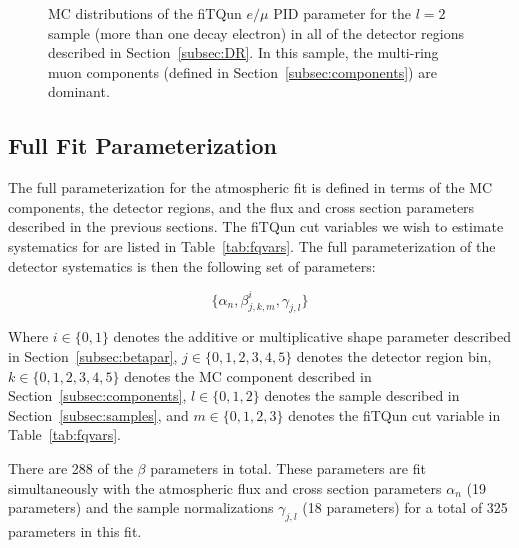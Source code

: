 \begin{figure}[h!]
\begin{tabular}{l  l  l}
\end{tabular} 
\caption{MC distributions of the fiTQun $e/\mu$ PID parameter for the $l=2$ 
sample (more than one decay electron) in all of the detector regions described in
Section~\ref{subsec:DR}.  In this sample, the multi-ring muon components
(defined in Section~\ref{subsec:components}) are dominant.}
\label{fig:samplot2}
\end{figure}
\FloatBarrier




\subsection{Full Fit Parameterization}
\label{subsec:fullpars}

The full parameterization for the atmospheric fit is defined in terms of the MC
components, the detector regions, and the flux and cross section parameters
described in the previous sections.  The fiTQun cut variables we wish to
estimate systematics for are listed in Table~\ref{tab:fqvars}. The full
parameterization of the detector systematics is then the following set of
parameters:

\begin{equation}
  \label{eq:fullpars}
  \{\alpha_{n}, \beta_{j,k,m}^{i}, \gamma_{j,l} \}
\end{equation}

Where $i \in \{0,1\}$ denotes the additive or multiplicative shape parameter
described in Section~\ref{subsec:betapar}, $j \in \{0,1,2,3,4,5\}$ denotes the
detector region bin, $k \in \{0,1,2,3,4,5\}$ denotes the MC component described
in Section~\ref{subsec:components},  $l \in \{0,1,2\}$ denotes the sample
described in Section~\ref{subsec:samples}, and $m \in \{0,1,2,3\}$ denotes the
fiTQun cut variable in Table~\ref{tab:fqvars}. 

There are 288 of the $\beta$ parameters in total.  These parameters are fit
simultaneously with the atmospheric flux and cross section parameters
$\alpha_{n}$ (19 parameters) and the sample normalizations $\gamma_{j,l}$ (18
parameters) for a total of 325 parameters in this fit.



